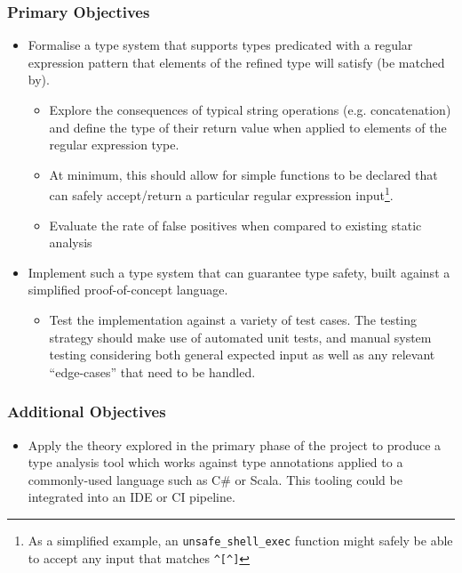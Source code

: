 \documentclass[a4paper]{article}
\begin{document}
    \subsubsection*{Primary Objectives}
    
    \begin{itemize}
        \item Formalise a type system that supports types predicated with a regular expression pattern that elements of the refined type will satisfy (be matched by).
       
        \begin{itemize}
           \item Explore the consequences of typical string operations (e.g. concatenation) and define the type of their return value when applied to elements of the regular expression type.
           
           \item At minimum, this should allow for simple functions to be declared that can safely accept/return a particular regular expression input\footnote{As a simplified example, an \texttt{unsafe\_shell\_exec} function might safely be able to accept any input that matches \texttt{\textasciicircum{}[\textasciicircum{}\textasciigrave{}]\textdollar{}}}.
           
           \item Evaluate the rate of false positives when compared to existing static analysis 
       \end{itemize}
        
        \item Implement such a type system that can guarantee type safety, built against a simplified proof-of-concept language.
        \begin{itemize}
            \item Test the implementation against a variety of test cases. The testing strategy should make use of automated unit tests, and manual system testing considering both general expected input as well as any relevant ``edge-cases'' that need to be handled.
        \end{itemize}
    \end{itemize}

    \subsubsection*{Additional Objectives}
    
    \begin{itemize}
        \item Apply the theory explored in the primary phase of the project to produce a type analysis tool which works against type annotations applied to a commonly-used language such as C\# or Scala. This tooling could be integrated into an IDE or CI pipeline.
    \end{itemize}
\end{document}
